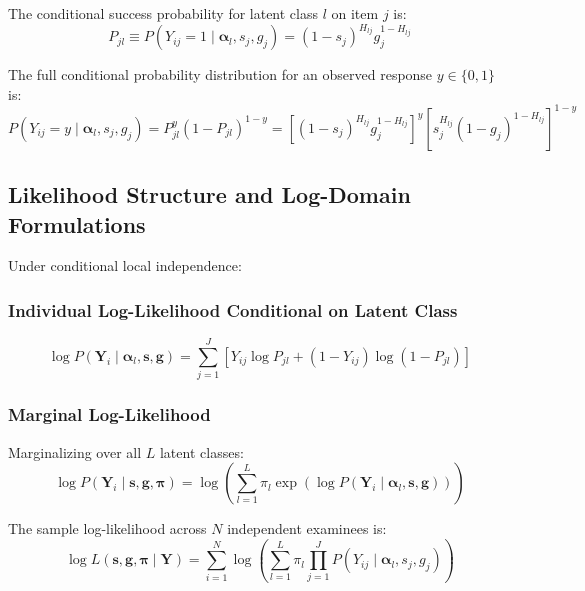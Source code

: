 \documentclass[11pt,a4paper]{article}
\begin{document}
The conditional success probability for latent class $l$ on item $j$ is:
\begin{equation}
    P_{jl} \equiv P(Y_{ij} = 1 \mid \boldsymbol{\alpha}_l, s_j, g_j) = (1 - s_j)^{H_{lj}} g_j^{1 - H_{lj}}
\end{equation}

The full conditional probability distribution for an observed response $y \in \{0, 1\}$ is:
\begin{equation}
    P(Y_{ij} = y \mid \boldsymbol{\alpha}_l, s_j, g_j) = P_{jl}^y (1 - P_{jl})^{1 - y} = \left[ (1 - s_j)^{H_{lj}} g_j^{1 - H_{lj}} \right]^y \left[ s_j^{H_{lj}} (1 - g_j)^{1 - H_{lj}} \right]^{1 - y}
\end{equation}

\subsection{Likelihood Structure and Log-Domain Formulations}

Under conditional local independence:

\subsubsection{Individual Log-Likelihood Conditional on Latent Class}
\begin{equation}
    \log P(\mathbf{Y}_i \mid \boldsymbol{\alpha}_l, \boldsymbol{s}, \boldsymbol{g}) = \sum_{j=1}^J \left[ Y_{ij} \log P_{jl} + (1 - Y_{ij}) \log(1 - P_{jl}) \right]
\end{equation}

\subsubsection{Marginal Log-Likelihood}
Marginalizing over all $L$ latent classes:
\begin{equation}
    \log P(\mathbf{Y}_i \mid \boldsymbol{s}, \boldsymbol{g}, \boldsymbol{\pi}) = \log \left( \sum_{l=1}^L \pi_l \exp \left( \log P(\mathbf{Y}_i \mid \boldsymbol{\alpha}_l, \boldsymbol{s}, \boldsymbol{g}) \right) \right)
\end{equation}

The sample log-likelihood across $N$ independent examinees is:
\begin{equation}
    \log L(\boldsymbol{s}, \boldsymbol{g}, \boldsymbol{\pi} \mid \mathbf{Y}) = \sum_{i=1}^N \log \left( \sum_{l=1}^L \pi_l \prod_{j=1}^J P(Y_{ij} \mid \boldsymbol{\alpha}_l, s_j, g_j) \right)
\end{equation}
\end{document}
